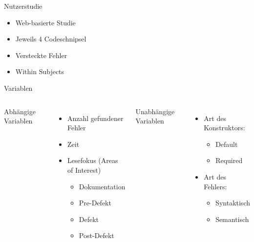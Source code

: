 \documentclass[10pt]{beamer}
\begin{document}
	\begin{frame}{Nutzerstudie}
		\begin{itemize}
			\item Web-basierte Studie\\
			\vspace{\baselineskip}
			\item Jeweils 4 Codeschnipsel\\
			\vspace{\baselineskip}
			\item Versteckte Fehler\\
			\vspace{\baselineskip}
			\item Within Subjects
		\end{itemize}
	\end{frame}

	\begin{frame}{Variablen}
		\begin{columns}[T,onlytextwidth]
	
			Abhängige Variablen
			\begin{itemize}
				\item Anzahl gefundener Fehler
				\item Zeit
				\item Lesefokus (Areas of Interest)
				\begin{itemize}
					\item Dokumentation
					\item Pre-Defekt
					\item Defekt
					\item Post-Defekt
				\end{itemize}
			\end{itemize}
		
			Unabhängige Variablen
			\begin{itemize}
				\item Art des Konstruktors:
				\begin{itemize}
					\item Default
					\item Required
				\end{itemize}
				\item Art des Fehlers:
				\begin{itemize}
					\item Syntaktisch
					\item Semantisch
				\end{itemize}
			\end{itemize}
		\end{columns}	
	\end{frame}
\end{document}
